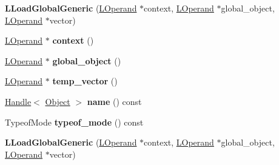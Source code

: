 \begin{DoxyCompactItemize}
\item 
{\bfseries L\+Load\+Global\+Generic} (\hyperlink{classv8_1_1internal_1_1_l_operand}{L\+Operand} $\ast$context, \hyperlink{classv8_1_1internal_1_1_l_operand}{L\+Operand} $\ast$global\+\_\+object, \hyperlink{classv8_1_1internal_1_1_l_operand}{L\+Operand} $\ast$vector)\hypertarget{classv8_1_1internal_1_1_l_load_global_generic_a5992cad6cdc59da767d3d35fdbf4c4f7}{}\label{classv8_1_1internal_1_1_l_load_global_generic_a5992cad6cdc59da767d3d35fdbf4c4f7}

\item 
\hyperlink{classv8_1_1internal_1_1_l_operand}{L\+Operand} $\ast$ {\bfseries context} ()\hypertarget{classv8_1_1internal_1_1_l_load_global_generic_acb9446dcc83f4319988b01ff0d957bf6}{}\label{classv8_1_1internal_1_1_l_load_global_generic_acb9446dcc83f4319988b01ff0d957bf6}

\item 
\hyperlink{classv8_1_1internal_1_1_l_operand}{L\+Operand} $\ast$ {\bfseries global\+\_\+object} ()\hypertarget{classv8_1_1internal_1_1_l_load_global_generic_a43bc76ffc93765b0231ba74a702acb19}{}\label{classv8_1_1internal_1_1_l_load_global_generic_a43bc76ffc93765b0231ba74a702acb19}

\item 
\hyperlink{classv8_1_1internal_1_1_l_operand}{L\+Operand} $\ast$ {\bfseries temp\+\_\+vector} ()\hypertarget{classv8_1_1internal_1_1_l_load_global_generic_a6e6428d159408fa7d9a31d38cc08919c}{}\label{classv8_1_1internal_1_1_l_load_global_generic_a6e6428d159408fa7d9a31d38cc08919c}

\item 
\hyperlink{classv8_1_1internal_1_1_handle}{Handle}$<$ \hyperlink{classv8_1_1internal_1_1_object}{Object} $>$ {\bfseries name} () const \hypertarget{classv8_1_1internal_1_1_l_load_global_generic_a8986cdf04702fb63aee12526199431ab}{}\label{classv8_1_1internal_1_1_l_load_global_generic_a8986cdf04702fb63aee12526199431ab}

\item 
Typeof\+Mode {\bfseries typeof\+\_\+mode} () const \hypertarget{classv8_1_1internal_1_1_l_load_global_generic_a92314902b26af0eba30f17b3c9e9d768}{}\label{classv8_1_1internal_1_1_l_load_global_generic_a92314902b26af0eba30f17b3c9e9d768}

\item 
{\bfseries L\+Load\+Global\+Generic} (\hyperlink{classv8_1_1internal_1_1_l_operand}{L\+Operand} $\ast$context, \hyperlink{classv8_1_1internal_1_1_l_operand}{L\+Operand} $\ast$global\+\_\+object, \hyperlink{classv8_1_1internal_1_1_l_operand}{L\+Operand} $\ast$vector)\hypertarget{classv8_1_1internal_1_1_l_load_global_generic_a5992cad6cdc59da767d3d35fdbf4c4f7}{}\label{classv8_1_1internal_1_1_l_load_global_generic_a5992cad6cdc59da767d3d35fdbf4c4f7}


\end{DoxyCompactItemize}
